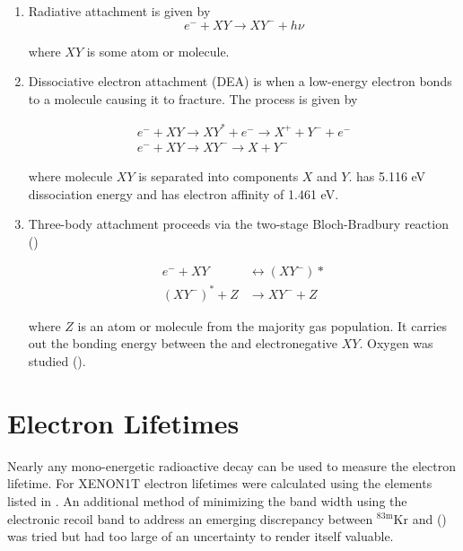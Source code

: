 \begin{enumerate}
\item Radiative attachment is given by
\begin{equation}
e^- + XY \rightarrow XY^- + h \nu
\end{equation}

\noindent where $XY$ is some atom or molecule.

\item Dissociative electron attachment (DEA) is when a low-energy electron bonds to a molecule causing it to fracture.  The process
is given by

\begin{equation}
\begin{aligned}
e^- + XY \rightarrow XY^* + e^- \rightarrow X^+ + Y^- + e^- \\
e^- + XY \rightarrow XY^- \rightarrow X + Y^-
\end{aligned}
\end{equation}

\noindent where molecule $XY$ is separated into components $X$ and $Y$.   has 5.116 eV dissociation energy and  has
electron affinity of 1.461 eV.

\item Three-body attachment proceeds via the two-stage Bloch-Bradbury reaction ()

\begin{equation}
\begin{aligned}
e^- + XY &\leftrightarrow (XY^-)* \\
(XY^-)^* + Z &\rightarrow XY^- + Z
\end{aligned}
\end{equation}

\noindent where $Z$ is an atom or molecule from the majority gas population.  It carries out the bonding energy between the
\electron and electronegative $XY$.  Oxygen was studied ().
\end{enumerate}



\section{Electron Lifetimes}
\label{sec:electron_lifetimes}
Nearly any mono-energetic radioactive decay can be used to measure the electron lifetime.  For XENON1T electron lifetimes were calculated
using the elements listed in .  An additional method of minimizing the \stwob band width using the
 electronic recoil band to address an emerging discrepancy between
$\mathrm{^{83m}Kr}$ and \alphadecays () was tried but had too large of an uncertainty
to render itself valuable.

